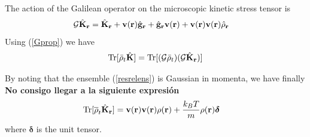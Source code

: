 \documentclass[b5paper,openright,11pt]{book}
\newcommand{\Note}[1]{{\bf \color{red}#1}}    %
\begin{document}
The  action  of the  Galilean  operator on  the
microscopic kinetic stress tensor is
\begin{align}
  {\cal G}\hat{{\bf K}}_{\bf r} &=
\hat{{\bf K}}_{\bf r} 
+{\bf v}({\bf r})\hat{\bf g}_{\bf r}
+\hat{\bf g}_{\bf r}{\bf v}({\bf r})
+{\bf v}({\bf r}){\bf v}({\bf r})\hat{\rho}_{\bf r}
\end{align}
Using (\ref{Gprop}) we have
\begin{align}
  {\rm Tr}[\bar{\rho}_t\hat{{\bf K}}]={\rm Tr}[({\cal G}\bar{\rho}_t)({\cal G}\hat{{\bf K}}_{\bf r})]
\end{align}

By noting that the ensemble (\ref{resrelens}) is Gaussian in momenta, we have finally \Note{No consigo llegar a la siguiente expresión}
\begin{align}
  {\rm Tr}[\overline{\rho}_t \hat{{\bf K}}_{\bf r}] &=
{\bf v}({\bf r}){\bf v}({\bf r}){\rho}({\bf r})+\frac{k_BT}{m}\rho({\bf r})\boldsymbol{\delta}
\label{api}
\end{align}
where $\boldsymbol{\delta}$ is the unit  tensor.  
\end{document}
